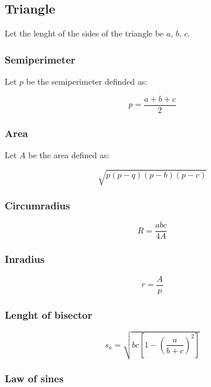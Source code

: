 
\subsection{Triangle}

Let the lenght of the sides of the triangle be $a$, $b$, $c$.

\subsubsection{Semiperimeter}

Let $p$ be the semiperimeter definded as: 

\begin{equation}
  p = \frac{a + b + c}{2}
\end{equation}

\subsubsection{Area}

Let $A$ be the area defined as:

\begin{equation}
  \sqrt{p(p-q)(p-b)(p-c)}
\end{equation}

\subsubsection{Circumradius}

\begin{equation}
  R = \frac{abc}{4A}
\end{equation}

\subsubsection{Inradius}

\begin{equation}
  r = \frac{A}{p}
\end{equation}

\subsubsection{Lenght of bisector}

\begin{equation}
s_a=\sqrt{bc\left[1-\left(\dfrac{a}{b+c}\right)^2\right]}
\end{equation}

\subsubsection{Law of sines}

